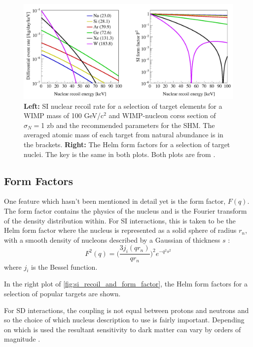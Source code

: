 \begin{figure}
    \centering
    \includegraphics[width=\textwidth]{Figures/LZ/SI_recoil_rate_and_spectra.png}
    \caption{\textbf{Left:} SI nuclear recoil rate for a selection of target elements for a WIMP mass of 100 GeV/c$^2$ and WIMP-nucleon corss section of $\sigma_N=$1 zb and the recommended parameters for the SHM. The averaged atomic mass of each target from natural abundance is in the brackets.
    \textbf{Right:} The Helm form factors for a selection of target nuclei. The key is the same in both plots.
    Both plots are from \cite{LZ_Ibles_LZStats_Thesis_ref}
    \label{fig:si_recoil_and_form_factor}.
           }
\end{figure}
 
\subsection{Form Factors}
\label{sec:form_factors}
\par
One feature which hasn't been mentioned in detail yet is the form factor, $F(q)$.
The form factor contains the physics of the nucleus and is the Fourier transform of the density distribution within.
For SI interactions, this is taken to be the Helm form factor where the nucleus is represented as a solid sphere of radius $r_n$, with a smooth density of nucleons described by a Gaussian of thickness $s$ \cite{helm_form_factor_ref}:
\begin{equation}
    F^2(q) = \bigg( \frac{3j_i(qr_n)}{qr_n} \bigg)^2 e^{-q^2 s^2}
\end{equation}
where $j_i$ is the Bessel function.
\par
In the right plot of \autoref{fig:si_recoil_and_form_factor}, the Helm form factors for a selection of popular targets are shown.

\par
For SD interactions, the coupling is not equal between protons and neutrons and so the choice of which nucleus description to use is fairly important.
Depending on which is used the resultant sensitivity to dark matter can vary by orders of magnitude \cite{wimp_nuclear_model_ref,wimp_sd_form_factor_ref}.
